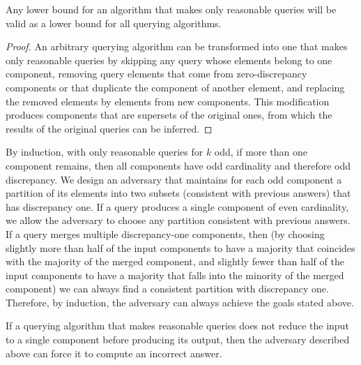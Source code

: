 \documentclass[11pt]{llncs}
\begin{document}
\begin{lemma}
Any lower bound for an algorithm that makes only reasonable queries will be valid as a lower bound for all querying algorithms.
\end{lemma}

\begin{proof}
An arbitrary querying algorithm can be transformed into one that makes only reasonable queries by skipping any query whose elements belong to one component, removing query elements that come from zero-discrepancy components or that duplicate the component of another element, and replacing the removed elements by elements from new components. This modification produces components that are supersets of the original ones, from which the results of the original queries  can be inferred.
\end{proof}

By induction, with only reasonable queries for $k$ odd, if more than one component remains, then all components have odd cardinality and therefore odd discrepancy. We design an adversary that maintains for each odd component a partition of its elements into two subsets (consistent with previous answers) that has discrepancy one. If a query produces a single component of even cardinality, we allow the adversary to choose any partition consistent with previous answers.
If a query merges multiple discrepancy-one components, then (by choosing slightly more than half of the input components to have a majority that coincides with the majority of the merged component, and slightly fewer than half of the input components to have a majority that falls into the minority of the merged component) we can always find a consistent partition with discrepancy one. Therefore, by induction, the adversary can always achieve the goals stated above.

\begin{lemma}
If a querying algorithm that makes reasonable queries does not reduce the input to a single component before producing its output, then the adversary described above can force it to compute an incorrect answer.
\end{lemma}
\end{document}
